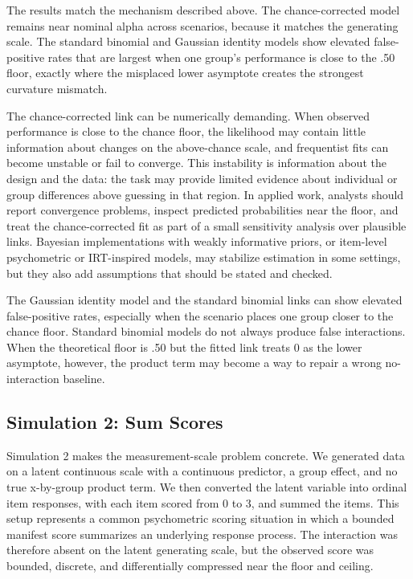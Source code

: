 \documentclass[
  man,
  longtable,
  nolmodern,
  notxfonts,
  notimes,
  colorlinks=true,linkcolor=blue,citecolor=blue,urlcolor=blue]{apa7}
\begin{document}
The results match the mechanism described above. The chance-corrected
model remains near nominal alpha across scenarios, because it matches
the generating scale. The standard binomial and Gaussian identity models
show elevated false-positive rates that are largest when one group's
performance is close to the .50 floor, exactly where the misplaced lower
asymptote creates the strongest curvature mismatch.

The chance-corrected link can be numerically demanding. When observed
performance is close to the chance floor, the likelihood may contain
little information about changes on the above-chance scale, and
frequentist fits can become unstable or fail to converge. This
instability is information about the design and the data: the task may
provide limited evidence about individual or group differences above
guessing in that region. In applied work, analysts should report
convergence problems, inspect predicted probabilities near the floor,
and treat the chance-corrected fit as part of a small sensitivity
analysis over plausible links. Bayesian implementations with weakly
informative priors, or item-level psychometric or IRT-inspired models,
may stabilize estimation in some settings, but they also add assumptions
that should be stated and checked.

The Gaussian identity model and the standard binomial links can show
elevated false-positive rates, especially when the scenario places one
group closer to the chance floor. Standard binomial models do not always
produce false interactions. When the theoretical floor is .50 but the
fitted link treats 0 as the lower asymptote, however, the product term
may become a way to repair a wrong no-interaction baseline.

\subsection{Simulation 2: Sum Scores}\label{simulation-2-sum-scores}

Simulation 2 makes the measurement-scale problem concrete. We generated
data on a latent continuous scale with a continuous predictor, a group
effect, and no true x-by-group product term. We then converted the
latent variable into ordinal item responses, with each item scored from
0 to 3, and summed the items. This setup represents a common
psychometric scoring situation in which a bounded manifest score
summarizes an underlying response process. The interaction was therefore
absent on the latent generating scale, but the observed score was
bounded, discrete, and differentially compressed near the floor and
ceiling.
\end{document}
